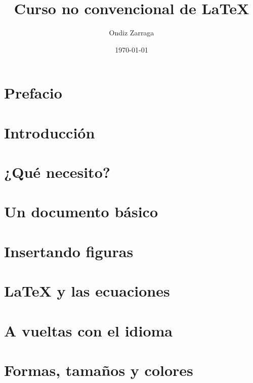 \documentclass[a4paper,10pt]{book}
\title{Curso no convencional de \LaTeX}
\author{Ondiz Zarraga}
\date{\today}
\begin{document}
\frontmatter
\maketitle
\thispagestyle{empty}

\tableofcontents
{}


\chapter*{Prefacio}


\mainmatter

\chapter{Introducción}


\chapter{¿Qué necesito?}


\chapter{Un documento básico}


\chapter{Insertando figuras}


\chapter{LaTeX y las ecuaciones}


\chapter{A vueltas con el idioma}\label{ch:idioma}


\chapter{Formas, tamaños y colores}

\end{document}
